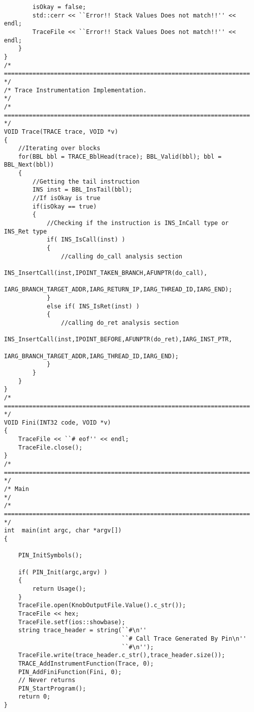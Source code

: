 \documentclass[a4paper, 11pt]{article}
\begin{document}
\begin{lstlisting}
        isOkay = false;
        std::cerr << ``Error!! Stack Values Does not match!!'' << endl;
        TraceFile << ``Error!! Stack Values Does not match!!'' << endl;
    }  
}
/* ===================================================================== */
/* Trace Instrumentation Implementation.                                 */
/* ===================================================================== */
VOID Trace(TRACE trace, VOID *v)
{
    //Iterating over blocks
    for(BBL bbl = TRACE_BblHead(trace); BBL_Valid(bbl); bbl = BBL_Next(bbl))
    {
        //Getting the tail instruction
        INS inst = BBL_InsTail(bbl);
        //If isOkay is true
        if(isOkay == true)
        {
            //Checking if the instruction is INS_InCall type or INS_Ret type
            if( INS_IsCall(inst) )
            {
                //calling do_call analysis section
                INS_InsertCall(inst,IPOINT_TAKEN_BRANCH,AFUNPTR(do_call),
                  IARG_BRANCH_TARGET_ADDR,IARG_RETURN_IP,IARG_THREAD_ID,IARG_END);     
            }
            else if( INS_IsRet(inst) )
            {
                //calling do_ret analysis section
                INS_InsertCall(inst,IPOINT_BEFORE,AFUNPTR(do_ret),IARG_INST_PTR,
                        IARG_BRANCH_TARGET_ADDR,IARG_THREAD_ID,IARG_END);
            }
        }
    }
}
/* ===================================================================== */
VOID Fini(INT32 code, VOID *v)
{
    TraceFile << ``# eof'' << endl;
    TraceFile.close();
}
/* ===================================================================== */
/* Main                                                                  */
/* ===================================================================== */
int  main(int argc, char *argv[])
{

    PIN_InitSymbols();

    if( PIN_Init(argc,argv) )
    {
        return Usage();
    }
    TraceFile.open(KnobOutputFile.Value().c_str());
    TraceFile << hex;
    TraceFile.setf(ios::showbase);
    string trace_header = string(``#\n''
                                 ``# Call Trace Generated By Pin\n''
                                 ``#\n'');
    TraceFile.write(trace_header.c_str(),trace_header.size());
    TRACE_AddInstrumentFunction(Trace, 0);
    PIN_AddFiniFunction(Fini, 0);
    // Never returns
    PIN_StartProgram();
    return 0;
}
\end{lstlisting}
\end{document}
